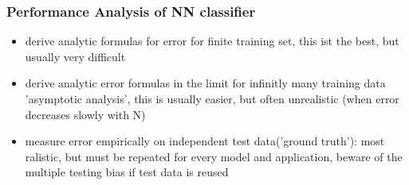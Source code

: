 \documentclass[11pt]{article}
\begin{document}
      \subsubsection{Performance Analysis of NN classifier}
        \begin{itemize}
          \item derive analytic formulas for error for finite training set, this ist the
          best, but usually very difficult
          \item derive analytic error formulas in the limit for infinitly many training data
          'asymptotic analysis', this is usually easier, but often unrealistic
          (when error decreases slowly with N)
          \item measure error empirically on independent test data('ground truth'):
          most ralistic, but must be repeated for every model and application, beware
          of the multiple testing bias if test data is reused
        \end{itemize}
\end{document}
